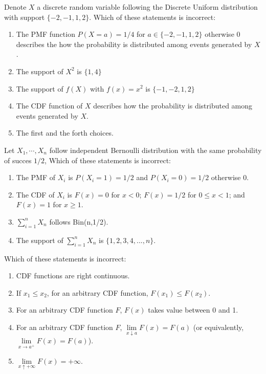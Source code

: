 \documentclass[poll_tutorial_format]{subfiles}
\begin{document}
		\begin{exercise}
			Denote $X$ a discrete random variable following the Discrete Uniform distribution with support $\{-2,-1,1,2\}$.
			Which of these statements is incorrect:
				\begin{enumerate}
						\item The PMF function $P(X=a)=1/4$ for $a\in \{-2,-1,1,2\}$ otherwise 0 describes the how the probability is distributed among events generated by $X$. 
						\item The support of $X^2$ is $\{1,4\}$
						\item The support of $f(X)$ with $f(x)=x^2$ is $\{-1,-2,1,2\}$  
						\item The CDF function of $X$ describes how the probability is distributed among events generated by $X$.  
						\item The first and the forth choices.
					\end{enumerate}
			\end{exercise}
	
	
	\begin{exercise}
		Let $X_1,\cdots , X_n$ follow independent Bernoulli distribution with the same probability of succes $1/2$, 
		Which of these statements is incorrect: 
		\begin{enumerate}
			\item The PMF of $X_i$ is $P(X_i=1)=1/2$ and $P(X_i=0)=1/2$ otherwise 0.
			\item The CDF of $X_i$ is $F(x)=0$ for $x<0$; $F(x)=1/2$ for $0\leq x <1$; and $F(x)=1$ for $x\geq 1$.  
			\item $\sum_{i=1}^n X_n$ follows  Bin(n,1/2).
			\item The support of $\sum_{i=1}^n X_n$ is $\{1,2,3,4,...,n\}$.
		\end{enumerate}
	\end{exercise}
	
	
	
	\begin{exercise}
		Which of these statements is incorrect: 
		\begin{enumerate}
			\item CDF functions are right continuous.
			\item If $x_1\leq x_2$, for an arbitrary CDF function, $F(x_1)\leq F(x_2)$.
			\item For an arbitrary CDF function $F$, $F(x)$ takes value between 0 and 1.
			\item For an arbitrary CDF function $F$, $\lim\limits_{x\downarrow a}F(x)=F(a)$ (or equivalently,  $\lim\limits_{x\rightarrow a^+}F(x)=F(a)$).
			\item $\lim\limits_{x\uparrow +\infty} F(x)=+\infty$. 
		\end{enumerate}
	\end{exercise}
	
\end{document}
